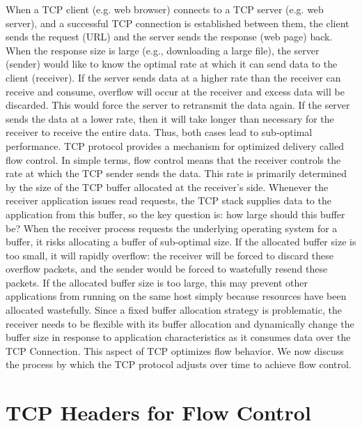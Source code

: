 \begin{multicols}{2}
When a TCP client (e.g. web browser) connects to a TCP server (e.g. web server), and a successful TCP connection is established between them, the client sends the request (URL) and the server sends the response (web page) back. When the response size is large (e.g., downloading a large file), the server (sender) would like to know the optimal rate at which it can send data to the client (receiver). If the server sends data at a higher rate than the receiver can receive and consume, overflow will occur at the receiver and excess data will be discarded. This would force the server to retransmit the data again. If the server sends the data at a lower rate, then it will take longer than necessary for the receiver to receive the entire data. Thus, both cases lead to sub-optimal performance. TCP protocol provides a mechanism for optimized delivery called flow control. In simple terms, flow control means that the receiver controls the rate at which the TCP sender sends the data. This rate is primarily determined by the size of the TCP buffer allocated at the receiver’s side. Whenever the receiver application issues read requests, the TCP stack supplies data to the application from this buffer, so the key question is: how large should this buffer be? When the receiver process requests the underlying operating system for a buffer, it risks allocating a buffer of sub-optimal size. If the allocated buffer size is too small, it will rapidly overflow: the receiver will be forced to discard these overflow packets, and the sender would be forced to wastefully resend these packets. If the allocated buffer size is too large, this may prevent other applications from running on the same host simply because resources have been allocated wastefully. Since a fixed buffer allocation strategy is problematic, the receiver needs to be flexible with its buffer allocation and dynamically change the buffer size in response to application characteristics as it consumes data over the TCP Connection. This aspect of TCP optimizes flow behavior. We now discuss the process by which the TCP protocol adjusts over time to achieve flow control.

\section{TCP Headers for Flow Control}


\end{multicols}
